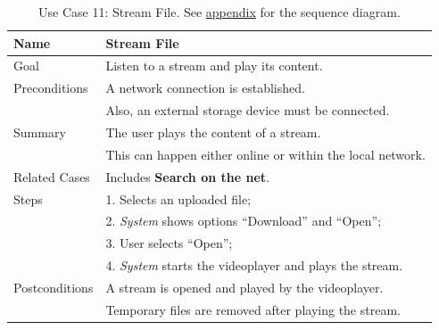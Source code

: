\begin{table}[h!]
\centering
\begin{tabular}{|l|l|}
\hline
Name & Stream File\\ \hline
Goal & Listen to a stream and play its content.\\ \hline
Preconditions & A network connection is established. \\
& Also, an external storage device must be connected. \\ \hline
Summary & The user plays the content of a stream. \\
& This can happen either online or within the local network.\\ \hline

Related Cases & Includes \textbf{Search on the net}. \\ \hline
Steps &  1. Selects an uploaded file; \\
      &  2. \textit{System} shows options ``Download'' and ``Open''; \\
      &  3. User selects ``Open''; \\
      &  4. \textit{System} starts the videoplayer and plays the stream.
        \\ \hline
Postconditions & A stream is opened and played by the videoplayer. \\
& Temporary files are removed after playing the stream.
\\ \hline
\end{tabular}
\caption{Use Case 11: Stream File. See \hyperref[fig:req_seq5]{appendix} for the sequence diagram.}
\label{tab:UC11}
\end{table}

